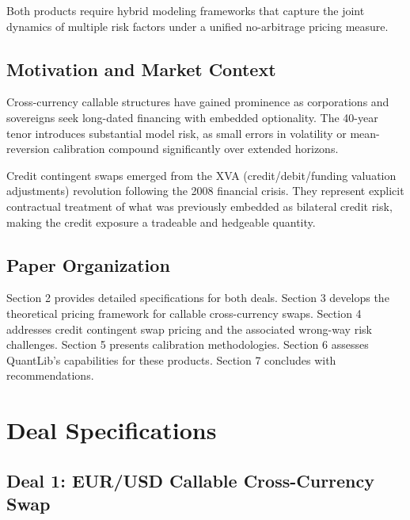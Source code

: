 \documentclass[conference]{IEEEtran}
\theoremstyle{definition}
\begin{document}
Both products require hybrid modeling frameworks that capture the joint dynamics of multiple risk factors under a unified no-arbitrage pricing measure.

\subsection{Motivation and Market Context}

Cross-currency callable structures have gained prominence as corporations and sovereigns seek long-dated financing with embedded optionality. The 40-year tenor introduces substantial model risk, as small errors in volatility or mean-reversion calibration compound significantly over extended horizons.

Credit contingent swaps emerged from the XVA (credit/debit/funding valuation adjustments) revolution following the 2008 financial crisis. They represent explicit contractual treatment of what was previously embedded as bilateral credit risk, making the credit exposure a tradeable and hedgeable quantity.

\subsection{Paper Organization}

Section 2 provides detailed specifications for both deals. Section 3 develops the theoretical pricing framework for callable cross-currency swaps. Section 4 addresses credit contingent swap pricing and the associated wrong-way risk challenges. Section 5 presents calibration methodologies. Section 6 assesses QuantLib's capabilities for these products. Section 7 concludes with recommendations.

\section{Deal Specifications}

\subsection{Deal 1: EUR/USD Callable Cross-Currency Swap}
\end{document}
